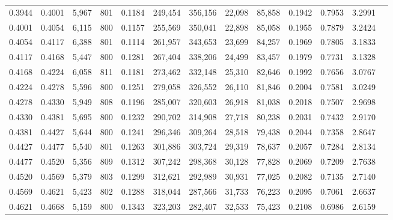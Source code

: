 \begin{tabular}{rrrrrrrrrrrrr}
0.3944 & 0.4001 &  5,967 & 801 &                                     0.1184 & 249,454 & 356,156 &  22,098 &  85,858 & 0.1942 & 0.7953 & 3.2991 \\
0.4001 & 0.4054 &  6,115 & 800 &                                     0.1157 & 255,569 & 350,041 &  22,898 &  85,058 & 0.1955 & 0.7879 & 3.2424 \\
0.4054 & 0.4117 &  6,388 & 801 &                                     0.1114 & 261,957 & 343,653 &  23,699 &  84,257 & 0.1969 & 0.7805 & 3.1833 \\
0.4117 & 0.4168 &  5,447 & 800 &                                     0.1281 & 267,404 & 338,206 &  24,499 &  83,457 & 0.1979 & 0.7731 & 3.1328 \\
0.4168 & 0.4224 &  6,058 & 811 &                                     0.1181 & 273,462 & 332,148 &  25,310 &  82,646 & 0.1992 & 0.7656 & 3.0767 \\
0.4224 & 0.4278 &  5,596 & 800 &                                     0.1251 & 279,058 & 326,552 &  26,110 &  81,846 & 0.2004 & 0.7581 & 3.0249 \\
0.4278 & 0.4330 &  5,949 & 808 &                                     0.1196 & 285,007 & 320,603 &  26,918 &  81,038 & 0.2018 & 0.7507 & 2.9698 \\
0.4330 & 0.4381 &  5,695 & 800 &                                     0.1232 & 290,702 & 314,908 &  27,718 &  80,238 & 0.2031 & 0.7432 & 2.9170 \\
0.4381 & 0.4427 &  5,644 & 800 &                                     0.1241 & 296,346 & 309,264 &  28,518 &  79,438 & 0.2044 & 0.7358 & 2.8647 \\
0.4427 & 0.4477 &  5,540 & 801 &                                     0.1263 & 301,886 & 303,724 &  29,319 &  78,637 & 0.2057 & 0.7284 & 2.8134 \\
0.4477 & 0.4520 &  5,356 & 809 &                                     0.1312 & 307,242 & 298,368 &  30,128 &  77,828 & 0.2069 & 0.7209 & 2.7638 \\
0.4520 & 0.4569 &  5,379 & 803 &                                     0.1299 & 312,621 & 292,989 &  30,931 &  77,025 & 0.2082 & 0.7135 & 2.7140 \\
0.4569 & 0.4621 &  5,423 & 802 &                                     0.1288 & 318,044 & 287,566 &  31,733 &  76,223 & 0.2095 & 0.7061 & 2.6637 \\
0.4621 & 0.4668 &  5,159 & 800 &                                     0.1343 & 323,203 & 282,407 &  32,533 &  75,423 & 0.2108 & 0.6986 & 2.6159 \\

\end{tabular}
